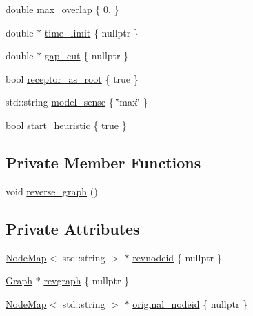 \begin{DoxyCompactItemize}
double \hyperlink{classderegnet_1_1DeregnetData_a43111d8664fd9db36f36f75b24ba62e9}{max\+\_\+overlap} \{ 0. \}
\item 
double $\ast$ \hyperlink{classderegnet_1_1DeregnetData_ac378faf7e8466135b8dc0ced907d98ae}{time\+\_\+limit} \{ nullptr \}
\item 
double $\ast$ \hyperlink{classderegnet_1_1DeregnetData_a3637c87366454adc152487fc2f5cfede}{gap\+\_\+cut} \{ nullptr \}
\item 
bool \hyperlink{classderegnet_1_1DeregnetData_ae7936fe59661a68464134b9251303727}{receptor\+\_\+as\+\_\+root} \{ true \}
\item 
std\+::string \hyperlink{classderegnet_1_1DeregnetData_ac3918536b5423facf0ac155997703c52}{model\+\_\+sense} \{ \char`\"{}max\char`\"{} \}
\item 
bool \hyperlink{classderegnet_1_1DeregnetData_abac721360704af5615f7ff84b183eebd}{start\+\_\+heuristic} \{ true \}
\end{DoxyCompactItemize}
\subsection*{Private Member Functions}
\begin{DoxyCompactItemize}
\item 
void \hyperlink{classderegnet_1_1DeregnetData_aa36e9ddbc2d055ac7661e74f8fa76da4}{reverse\+\_\+graph} ()
\end{DoxyCompactItemize}
\subsection*{Private Attributes}
\begin{DoxyCompactItemize}
\item 
\hyperlink{namespacederegnet_ae102b707ae1d6f83c639ece5e0dd5658}{Node\+Map}$<$ std\+::string $>$ $\ast$ \hyperlink{classderegnet_1_1DeregnetData_ad15bd1f0e5ab9d01b82b5c696203b855}{revnodeid} \{ nullptr \}
\item 
\hyperlink{namespacederegnet_a55b76c55bbabc682cbc61f8b9948799e}{Graph} $\ast$ \hyperlink{classderegnet_1_1DeregnetData_a4b6a17e13aeda78317ff37567e7fd26d}{revgraph} \{ nullptr \}
\item 
\hyperlink{namespacederegnet_ae102b707ae1d6f83c639ece5e0dd5658}{Node\+Map}$<$ std\+::string $>$ $\ast$ \hyperlink{classderegnet_1_1DeregnetData_a6707f9bbc1ac5ccf78724e73cd8053b1}{original\+\_\+nodeid} \{ nullptr \}
\end{DoxyCompactItemize}



